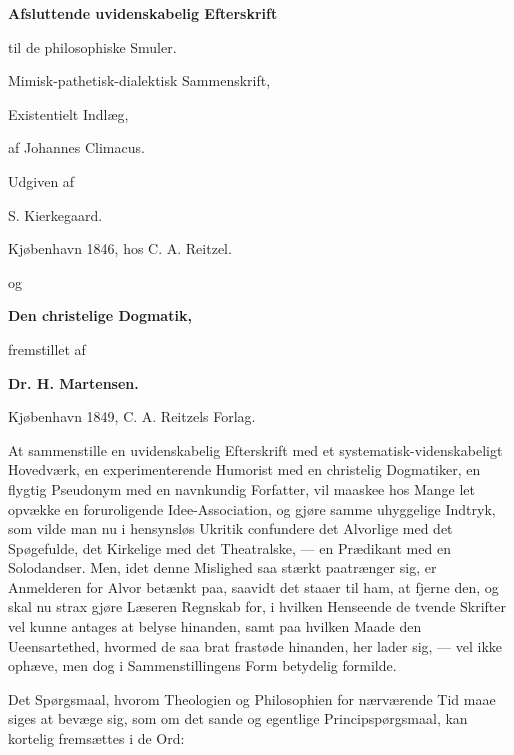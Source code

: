 \begin{center}
{\large\bfseries Afsluttende uvidenskabelig Efterskrift\par}
{\large til de philosophiske Smuler.\par}
\vspace{0.35em}
{Mimisk-pathetisk-dialektisk Sammenskrift,\par}
{Existentielt Indlæg,\par}
{af Johannes Climacus.\par}
\vspace{0.35em}
{\small Udgiven af\par}
{S. Kierkegaard.\par}
\vspace{0.2em}
{\small Kjøbenhavn 1846, hos C. A. Reitzel.\par}
\vspace{0.9em}
{og\par}
\vspace{0.9em}
{\large\bfseries Den christelige Dogmatik,\par}
{fremstillet af\par}
{\bfseries Dr. H. Martensen.\par}
\vspace{0.2em}
{\small Kjøbenhavn 1849, C. A. Reitzels Forlag.\par}
\end{center}

 At sammenstille en uvidenskabelig Efterskrift med et
systematisk-videnskabeligt Hovedværk, en experimenterende Humorist
med en christelig Dogmatiker, en flygtig Pseudonym med en
navnkundig Forfatter, vil maaskee hos Mange let opvække en
foruroligende Idee-Association, og gjøre samme uhyggelige Indtryk,
som vilde man nu i hensynsløs Ukritik confundere det Alvorlige med
det Spøgefulde, det Kirkelige med det Theatralske, --- en Prædikant
med en Solodandser. Men, idet denne Mislighed saa stærkt
paatrænger sig, er Anmelderen for Alvor betænkt paa, saavidt det
staaer til ham, at fjerne den, og skal nu strax gjøre Læseren
Regnskab for, i hvilken Henseende de tvende Skrifter vel kunne
antages at belyse hinanden, samt paa hvilken Maade den
Ueensartethed, hvormed de saa brat frastøde hinanden, her lader
sig, --- vel ikke ophæve, men dog i Sammenstillingens Form
betydelig formilde.

Det Spørgsmaal, hvorom Theologien og Philosophien for nærværende
Tid maae siges at bevæge sig, som om det sande og egentlige
Principspørgsmaal, kan kortelig fremsættes i de Ord:

